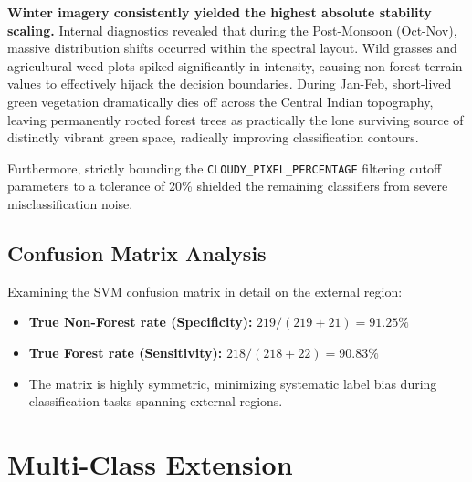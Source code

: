 \documentclass[12pt, a4paper, twocolumn]{article}
\begin{document}
\begin{table}[H]
\centering
\caption{Seasonal accuracy comparisons demonstrating catastrophic classification collapses outside of the dry Winter season bounds.}
\label{tab:seasons}
\end{table}

\textbf{Winter imagery consistently yielded the highest absolute stability scaling.} Internal diagnostics revealed that during the Post-Monsoon (Oct-Nov), massive distribution shifts occurred within the spectral layout. Wild grasses and agricultural weed plots spiked significantly in intensity, causing non-forest terrain values to effectively hijack the decision boundaries. During Jan-Feb, short-lived green vegetation dramatically dies off across the Central Indian topography, leaving permanently rooted forest trees as practically the lone surviving source of distinctly vibrant green space, radically improving classification contours.

Furthermore, strictly bounding the \texttt{CLOUDY\_PIXEL\_PERCENTAGE} filtering cutoff parameters to a tolerance of 20\% shielded the remaining classifiers from severe misclassification noise.

\subsection{Confusion Matrix Analysis}

Examining the SVM confusion matrix in detail on the external region:
\begin{itemize}
    \item \textbf{True Non-Forest rate (Specificity):} $219 / (219 + 21) = 91.25\%$
    \item \textbf{True Forest rate (Sensitivity):} $218 / (218 + 22) = 90.83\%$
    \item The matrix is highly symmetric, minimizing systematic label bias during classification tasks spanning external regions.
\end{itemize}

\section{Multi-Class Extension}
\label{sec:multiclass}
\end{document}
